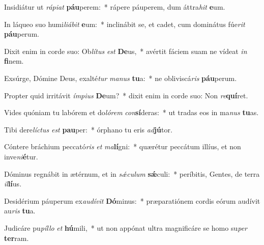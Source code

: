 \item Insidiátur ut \textit{rá}\textit{pi}\textit{at} \textbf{páu}perem:~* rápere páuperem, dum áttra\textit{hit} \textbf{e}um.
\item In láqueo suo humi\textit{li}\textit{á}\textit{bit} \textbf{e}um:~* inclinábit se, et cadet, cum dominátus fúe\textit{rit} \textbf{páu}perum.
\item Dixit enim in corde suo: Ob\textit{lí}\textit{tus} \textit{est} \textbf{De}us,~* avértit fáciem suam ne vídeat \textit{in} \textbf{fi}nem.
\item Exsúrge, Dómine Deus, exalté\textit{tur} \textit{ma}\textit{nus} \textbf{tu}a:~* ne obliviscá\textit{ris} \textbf{páu}perum.
\item Propter quid irritávit \textit{ím}\textit{pi}\textit{us} \textbf{De}um?~* dixit enim in corde suo: Non \textit{re}\textbf{quí}ret.
\item Vides quóniam tu labórem et do\textit{ló}\textit{rem} \textit{con}\textbf{sí}deras:~* ut tradas eos in ma\textit{nus} \textbf{tu}as.
\item Tibi dere\textit{líc}\textit{tus} \textit{est} \textbf{pau}per:~* órphano tu eris \textit{ad}\textbf{jú}tor.
\item Cóntere bráchium peccató\textit{ris} \textit{et} \textit{ma}\textbf{lí}gni:~* quærétur peccátum illíus, et non inve\textit{ni}\textbf{é}tur.
\item Dóminus regnábit in ætérnum, et in \textit{sǽ}\textit{cu}\textit{lum} \textbf{sǽ}culi:~* períbitis, Gentes, de terra \textit{il}\textbf{lí}us.
\item Desidérium páuperum ex\textit{au}\textit{dí}\textit{vit} \textbf{Dó}minus:~* præparatiónem cordis eórum audívit au\textit{ris} \textbf{tu}a.
\item Judicáre pu\textit{píl}\textit{lo} \textit{et} \textbf{hú}mili,~* ut non appónat ultra magnificáre se homo su\textit{per} \textbf{ter}ram.
